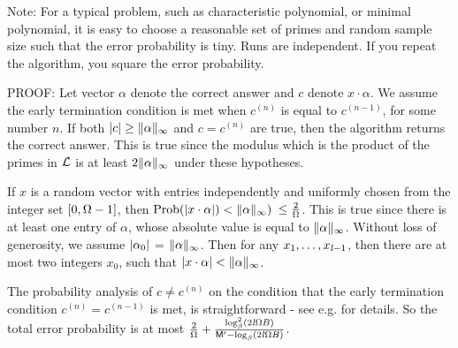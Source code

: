 Note: For a typical problem, such as characteristic polynomial, 
or minimal polynomial, it is easy to choose a reasonable set of primes 
and random sample size
such that the error probability is tiny.  Runs are independent. If you
repeat the algorithm, you square the error probability.

PROOF:
Let vector $\alpha$ denote the correct answer and
$c$ denote $x \cdot \alpha$. 
We assume the early termination condition is met when 
$c^{(n)}$ is equal to $c^{(n-1)}$, for some number $n$. 
If both $|c| \geq \|\alpha\|_\infty$ and
$c = c^{(n)}$ are true, then the algorithm returns the correct answer.
This is true since the modulus which is the product of the primes in $\mathcal L$ is at least 
$2 \|\alpha\|_\infty$ under these hypotheses.

If $x$ is a random vector with entries 
independently and uniformly chosen from the integer set $[0, \Omega-1]$,
then $\mbox{Prob} (|x \cdot \alpha|) < \|\alpha\|_\infty)$
$\leq \frac{2}{\Omega}$.
This is true since
there is at least one entry of $\alpha$, whose absolute value is
equal to $\|\alpha\|_\infty$.
Without loss of generosity, we assume $|\alpha_0|$ = $\|\alpha\|_\infty$.
Then for any $x_1, \ldots, x_{\mathit l-1}$, then there are at most two integers $x_0$, 
such that $|x \cdot \alpha| < \|\alpha\|_\infty$.

The probability analysis of $c \not= c^{(n)}$ 
on the condition that the early termination condition $c^{(n)} = c^{(n-1)}$ is met,
is straightforward - see e.g. \cite[Theorem 1.]{Kaltofen02} for details.
So the total error probability is at most 
$\frac{2}{\Omega} +
\frac{\log^2_{\beta}(2\mathit l \Omega B)}
{\mathsf M^\prime - \log_{\beta}(2\mathit l \Omega B)}$.
%
%
%
%
%
\QED
